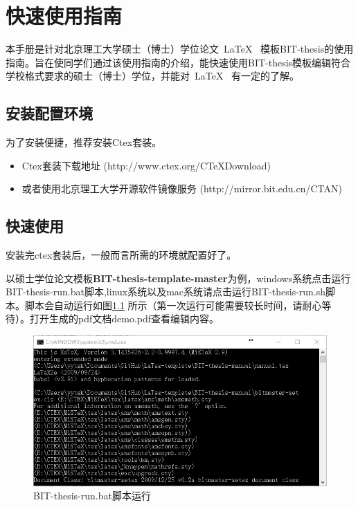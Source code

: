 
\chapter{快速使用指南}
\label{chap:what}

本手册是针对北京理工大学硕士（博士）学位论文~\LaTeX~ 模板BIT-thesis的使用指南。旨在使同学们通过该使用指南的介绍，能快速使用BIT-thesis模板编辑符合学校格式要求的硕士（博士）学位，并能对~\LaTeX~ 有一定的了解。


\section{安装配置环境}
\label{sec:requirements}

为了安装便捷，推荐安装Ctex套装。

\begin{itemize}
\item Ctex套装下载地址 
(http://www.ctex.org/CTeXDownload)

\item 或者使用北京理工大学开源软件镜像服务
(http://mirror.bit.edu.cn/CTAN)

\end{itemize}



\section{快速使用}
\label{sec:process}

安装完ctex套装后，一般而言所需的环境就配置好了。

以硕士学位论文模板\textbf{BIT-thesis-template-master}为例，windows系统点击运行BIT-thesis-run.bat脚本,linux系统以及mac系统请点击运行BIT-thesis-run.sh脚本。脚本会自动运行如图\ref{fig:run} 所示（第一次运行可能需要较长时间，请耐心等待）。打开生成的pdf文档demo.pdf查看编辑内容。
 
\begin{figure}[!htp]
  \centering
  \label{fig:run}
  \includegraphics[width=\textwidth]{figures/BIT-thesis-run}
  \caption{BIT-thesis-run.bat脚本运行}
\end{figure}


